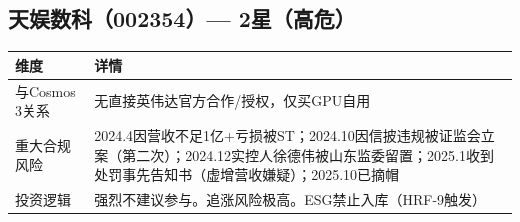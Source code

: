 \subsection{天娱数科（002354）--- 2星（高危）}

\begin{table}[H]
\centering\small
\renewcommand{\arraystretch}{1.3}
\begin{tabularx}{\textwidth}{l X}
\toprule
\textbf{维度} & \textbf{详情} \\
\midrule
与Cosmos 3关系 & \textcolor{riskred}{无直接英伟达官方合作/授权，仅买GPU自用} \\
\textcolor{riskred}{重大合规风险} & \textcolor{riskred}{2024.4因营收不足1亿+亏损被ST；2024.10因信披违规被证监会立案（第二次）；2024.12实控人徐德伟被山东监委留置；2025.1收到处罚事先告知书（虚增营收嫌疑）；2025.10已摘帽} \\
投资逻辑 & \textcolor{riskred}{强烈不建议参与}。追涨风险极高。ESG禁止入库（HRF-9触发） \\
\bottomrule
\end{tabularx}
\end{table}
